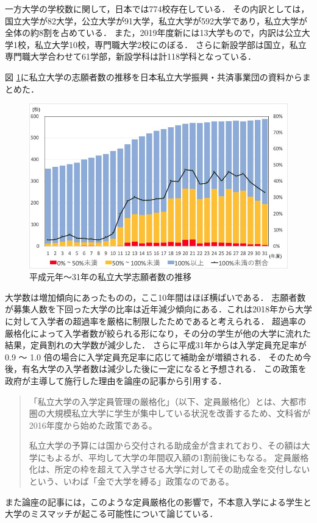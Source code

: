 一方大学の学校数に関して，日本では774校存在している\cite{university_num}．
その内訳としては，国立大学が82大学，公立大学が91大学，私立大学が592大学であり，私立大学が全体の約8割を占めている．
また，2019年度新には13大学もので，内訳は公立大学1校，私立大学10校，専門職大学2校にのぼる．
さらに新設学部は国立，私立専門職大学合わせて61学部，新設学科は計118学科となっている．

図 \ref{fig:shigan}に私立大学の志願者数の推移を日本私立大学振興・共済事業団の資料\cite{shigan}からまとめた．
\begin{figure}[H]
\centering
\includegraphics[scale=0.53]{images/shigansya.jpg}
\caption{平成元年〜31年の私立大学志願者数の推移}
\label{fig:shigan}
\end{figure}
大学数は増加傾向にあったものの，ここ10年間はほぼ横ばいである．
志願者数が募集人数を下回った大学の比率は近年減少傾向にある．これは2018年から大学に対して入学者の超過率を厳格に制限\cite{hojokin1}したためであると考えられる．
超過率の厳格化によって入学者数が絞られる形になり，その分の学生が他の大学に流れた結果，定員割れの大学数が減少した．
さらに平成31年からは入学定員充足率が 0.9 〜 1.0 倍の場合に入学定員充足率に応じて補助金が増額される\cite{hojokin2}．
そのため今後，有名大学の入学者数は減少した後に一定になると予想される．
この政策を政府が主導して施行した理由を論座の記事\cite{ronza}から引用する．
\begin{quotation}
「私立大学の入学定員管理の厳格化」（以下、定員厳格化）とは、大都市圏の大規模私立大学に学生が集中している状況を改善するため、文科省が2016年度から始めた政策である。

私立大学の予算には国から交付される助成金が含まれており、その額は大学にもよるが、平均して大学の年間収入額の1割前後にもなる。
定員厳格化は、所定の枠を超えて入学させる大学に対してその助成金を交付しないという、いわば「金で大学を縛る」政策なのである。
\end{quotation}
また論座の記事には，このような定員厳格化の影響で，不本意入学による学生と大学のミスマッチが起こる可能性について論じている．

